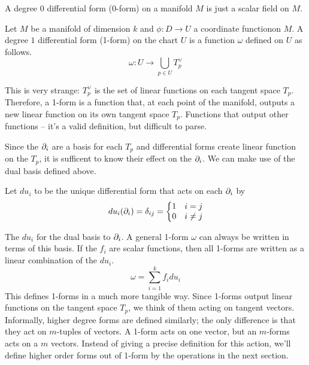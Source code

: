 \documentclass[fleqn,letterpaper]{report}
\begin{document}
\begin{defn}
A degree $0$ differential form (0-form) on a manifold $M$ is just a
scalar field on $M$.
\end{defn}

\begin{defn}
Let $M$ be a manifold of dimension $k$ and $\phi: D
\rightarrow U$ a coordinate functionon $M$. A degree $1$
differential form (1-form) on the chart $U$ is a function
$\omega$ defined on $U$ as follows.
\begin{equation*}
\omega: U \rightarrow \bigcup_{p \in U} T_p^\vee
\end{equation*}
\end{defn}

This is very strange: $T_p^\vee$ is the set of linear
functions on each tangent space $T_p$. Therefore, a 1-form is
a function that, at each point of the manifold, outputs a new
linear function on its own tangent space $T_p$. Functions that
output other functions -- it's a valid definition, but
difficult to parse. 

Since the $\partial_i$ are a basis for each $T_p$ and differential
forms create linear function on the $T_p$, it is sufficent to
know their effect on the $\partial_i$. We can make use of the dual
basis defined above.

\begin{defn}
Let $du_i$ to be the unique differential form that acts on
each $\partial_i$ by 
\begin{equation*}
du_i (\partial_i) = \delta_{ij} = \left\{ \begin{matrix} 1 & i = j
\\ 0 & i \neq j \end{matrix} \right.
\end{equation*}
\end{defn}

The $du_i$ for the dual basis to $\partial_i$. A general 1-form
$\omega$ can always be written in terms of this basis. If the
$f_i$ are scalar functions, then all 1-forms are written as a
linear combination of the $du_i$.
\begin{equation*}
\omega = \sum_{i=1}^k f_i du_i
\end{equation*}
This defines 1-forms in a much more tangible way. Since
1-forms output linear functions on the tangent space $T_p$, we
think of them acting on tangent vectors. Informally, higher
degree forms are defined similarly; the only difference is
that they act on $m$-tuples of vectors. A 1-form acts on one
vector, but an $m$-forms acts on a $m$ vectors.
Instead of giving a precise definition for this action, we'll
define higher order forms out of 1-form by the operations in
the next section.
\end{document}
